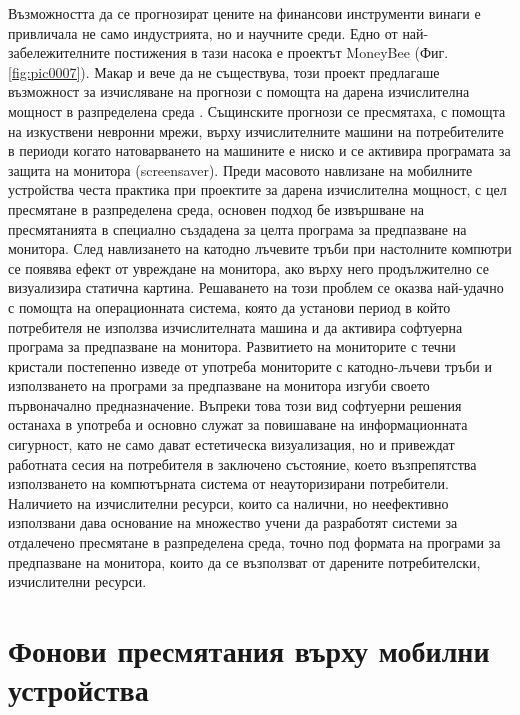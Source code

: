 \documentclass[book,14pt,oneside,openany]{memoir}
\begin{document}
Възможността да се прогнозират цените на финансови инструменти винаги е привличала не само индустрията, но и научните среди. Едно от най-забележителните постижения в тази насока е проектът MoneyBee (Фиг. \ref{fig:pic0007}). Макар и вече да не съществува, този проект предлагаше възможност за изчисляване на прогнози с помощта на дарена изчислителна мощност в разпределена среда \cite{bohn}. Същинските прогнози се пресмятаха, с помощта на изкуствени невронни мрежи, върху изчислителните машини на потребителите в периоди когато натоварването на машините е ниско и се активира програмата за защита на монитора (screensaver). Преди масовото навлизане на мобилните устройства честа практика при проектите за дарена изчислителна мощност, с цел пресмятане в разпределена среда, основен подход бе извършване на пресмятанията в специално създадена за целта програма за предпазване на монитора. След навлизането на катодно лъчевите тръби при настолните компютри се появява ефект от увреждане на монитора, ако върху него продължително се визуализира статична картина. Решаването на този проблем се оказва най-удачно с помощта на операционната система, която да установи период в който потребителя не използва изчислителната машина и да активира софтуерна програма за предпазване на монитора. Развитието на мониторите с течни кристали постепенно изведе от употреба мониторите с катодно-лъчеви тръби и използването на програми за предпазване на монитора изгуби своето първоначално предназначение. Въпреки това този вид софтуерни решения останаха в употреба и основно служат за повишаване на информационната сигурност, като не само дават естетическа визуализация, но и привеждат работната сесия на потребителя в заключено състояние, което възпрепятства използването на компютърната система от неауторизирани потребители. Наличието на изчислителни ресурси, които са налични, но неефективно използвани дава основание на множество учени да разработят системи за отдалечено пресмятане в разпределена среда, точно под формата на програми за предпазване на монитора, които да се възползват от дарените потребителски, изчислителни ресурси. 

\section{Фонови пресмятания върху мобилни устройства}
\end{document}
